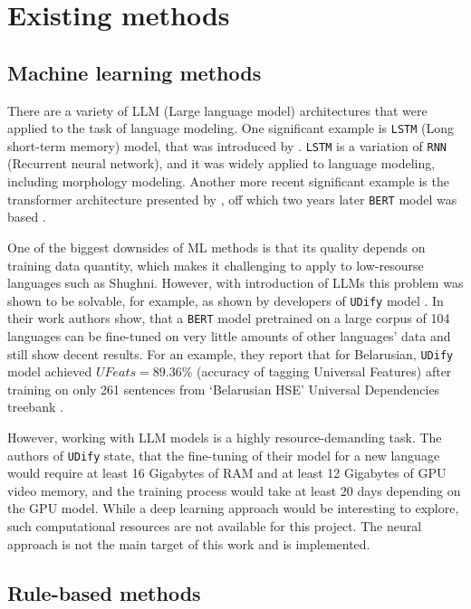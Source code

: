 \section{Existing methods}

\subsection{Machine learning methods} \label{dl_methods}
There are a variety of LLM (Large language model) architectures that were applied to the task of language modeling. One significant example is \texttt{LSTM} (Long short-term memory) model, that was introduced by \textcite{lstm_1997}. \texttt{LSTM} is a variation of \texttt{RNN} (Recurrent neural network), and it was widely applied to language modeling, including morphology modeling. Another more recent significant example is the transformer architecture presented by \textcite{transformer_2017}, off which two years later \texttt{BERT} model was based \parencite{devlin_2019}. 

One of the biggest downsides of ML methods is that its quality depends on training data quantity, which makes it challenging to apply to low-resourse languages such as Shughni. However, with introduction of LLMs this problem was shown to be solvable, for example, as shown by developers of \texttt{UDify} model \parencite{kondratyuk_straka_model_2019}. In their work authors show, that a \texttt{BERT} model pretrained on a large corpus of 104 languages can be fine-tuned on very little amounts of other languages' data and still show decent results. For an example, they report that for Belarusian, \texttt{UDify} model achieved $UFeats=89.36\%$ (accuracy of tagging Universal Features) after training on only 261 sentences from `Belarusian HSE' Universal Dependencies treebank \parencite[Table 7]{kondratyuk_straka_model_2019}.

However, working with LLM models is a highly resource-demanding task. The authors of \texttt{UDify} state, that the fine-tuning of their model for a new language would require at least 16 Gigabytes of RAM and at least 12 Gigabytes of GPU video memory, and the training process would take at least 20 days depending on the GPU model. While a deep learning approach would be interesting to explore, such computational resources are not available for this project. The neural approach is not the main target of this work and is implemented. 

\subsection{Rule-based methods}
